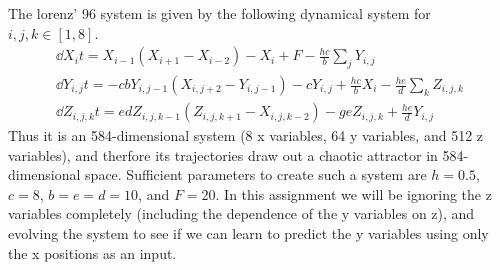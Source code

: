 \documentclass{article}
\begin{document}
The lorenz' 96 system is given by the following dynamical system for $i,
j, k \in [1,8]$. 
\begin{gather*}
    \dd{X_i}{t} =
    X_{i-1}\left(X_{i+1}-X_{i-2}\right)-X_i + F -\frac{hc}{b}\sum_j Y_{i,j}\\
    \dd{Y_{i,j}}{t} =
    -cbY_{i,j-1}\left(X_{i,j+2}-Y_{i,j-1}\right)-cY_{i,j}+\frac{hc}{b}X_i-\frac{he}{d}\sum_k
    Z_{i,j,k}\\
    \dd{Z_{i,j,k}}{t} =
    edZ_{i,j,k-1}\left(Z_{i,j,k+1}-X_{i,j,k-2}\right)-geZ_{i,j,k}+\frac{he}{d}Y_{i,j}
\end{gather*}
Thus it is an 584-dimensional system (8 x variables, 64 y variables, and
512 z variables), and therfore its trajectories draw out a chaotic
attractor in 584-dimensional space. Sufficient parameters to create such
a system are $h = 0.5$, $c = 8$, $b = e = d = 10$, and $F = 20$. In this
assignment we will be ignoring the z variables completely (including the
dependence of the y variables on z), and evolving the system to see if
we can learn to predict the y variables using only the x positions as an
input. 
\end{document}
